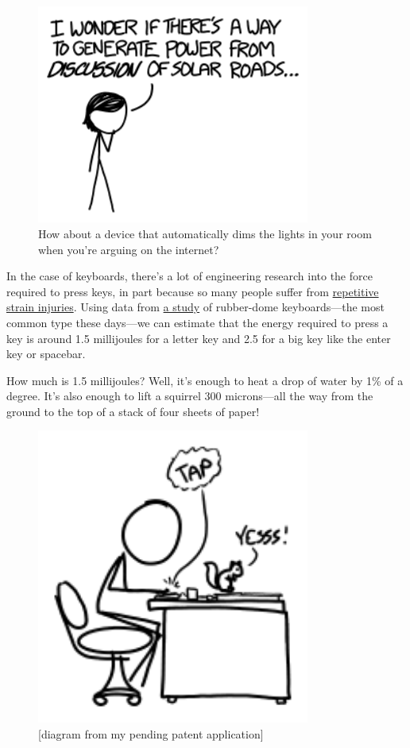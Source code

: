 {\begin{figure}[!htbp]
\centering
\includegraphics[scale=0.5, max width=0.8\textwidth]{imgs/a/102/idea.png}
\caption{How about a device that automatically dims the lights in your room when you're arguing on the internet?}
\end{figure}

{In the case of keyboards, there's a lot of engineering research into the force required to press keys, in part because so many people suffer from \href{https://en.wikipedia.org/wiki/Repetitive\_strain\_injury}{repetitive strain injuries}. Using data from \href{http://ieeexplore.ieee.org/xpl/articleDetails.jsp?arnumber=786140}{a study} of rubber-dome keyboards—the most common type these days—we can estimate that the energy required to press a key is around 1.5 millijoules for a letter key and 2.5 for a big key like the enter key or spacebar.}

{How much is 1.5 millijoules? Well, it's enough to heat a drop of water by 1\% of a degree. It's also enough to lift a squirrel 300 microns—all the way from the ground to the top of a stack of four sheets of paper!}

\begin{figure}[!htbp]
\centering
\includegraphics[scale=0.5, max width=0.8\textwidth]{imgs/a/102/squirrel.png}
\caption{[diagram from my pending patent application]}
\end{figure}

}
